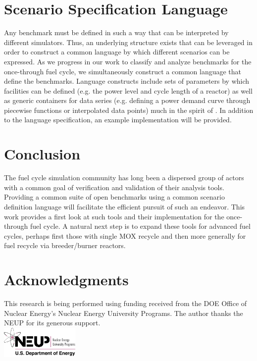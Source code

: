 \documentclass{anstrans}
\begin{document}
\section{Scenario Specification Language}
Any benchmark must be defined in such a way that can be interpreted by
different simulators. Thus, an underlying structure exists that can be
leveraged in order to construct a common language by which different
scenarios can be expressed. As we progress in our work to classify and
analyze benchmarks for the once-through fuel cycle, we simultaneously
construct a common language that define the benchmarks. Language 
constructs include sets of parameters by which facilities can be
defined (e.g. the power level and cycle length of a reactor) as well
as generic containers for data series (e.g. defining a power demand 
curve through piecewise functions or interpolated data points) much
in the spirit of \cite{mattoon_generalized_2012}. In addition to the
language specification, an example implementation will be provided.

\section{Conclusion}
The fuel cycle simulation community has long been a dispersed group of
actors with a common goal of verification and validation of their
analysis tools. Providing a common suite of open benchmarks using a
common scenario definition language will facilitate the efficient
pursuit of such an endeavor. This work provides a first look at such
tools and their implementation for the once-through fuel cycle. A
natural next step is to expand these tools for advanced fuel cycles,
perhaps first those with single MOX recycle and then more generally
for fuel recycle via breeder/burner reactors.

\section{Acknowledgments}
This research is being performed using funding received from the DOE
Office of Nuclear Energy's Nuclear Energy University Programs.  The
author thanks the NEUP for its generous support.\\
\includegraphics[width=1.5in]{neup_logo_large.jpg}


\end{document}
